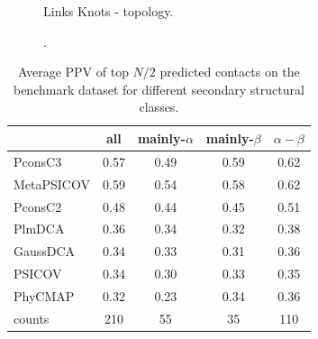 \documentclass[a4,center,fleqn]{NAR}
\begin{document}
\begin{figure}[t]
\begin{center}
\end{center}
\caption{Links Knots - topology.}
\label{fig:Interface}
\end{figure}


\begin{figure}[t]
\begin{center}
\end{center}
\caption{.}
\label{fig:exampel PF0009.24}
\end{figure}


\begin{table}[t!]
\centering
{\begin{tabular}{lcccc}
  \hline
 & all & mainly-$\alpha$ & mainly-$\beta$ & $\alpha-\beta$ \\ 
  \hline
  PconsC3 & 0.57 & 0.49 & 0.59 & 0.62 \\ 
    MetaPSICOV & 0.59 & 0.54 & 0.58 & 0.62 \\ 
    PconsC2 & 0.48 & 0.44 & 0.45 & 0.51 \\ 
    PlmDCA & 0.36 & 0.34 & 0.32 & 0.38 \\ 
    GaussDCA & 0.34 & 0.33 & 0.31 & 0.36 \\ 
    PSICOV & 0.34 & 0.30 & 0.33 & 0.35 \\ 
    PhyCMAP & 0.32 & 0.23 & 0.34 & 0.36 \\ 
   \hline
  counts & 210 & 55 & 35 & 110 \\
   \hline
\end{tabular}}{}
\caption{Average PPV of top $N/2$ predicted contacts on the benchmark dataset for different secondary structural classes. \label{tab:ss}}
\end{table}
\end{document}
